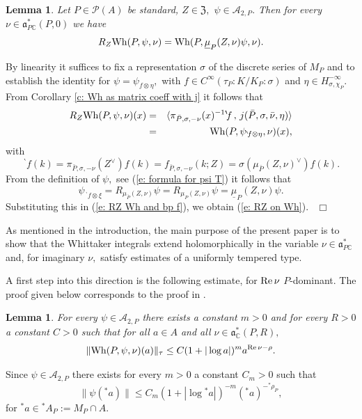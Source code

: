 \documentclass[12pt,a4paper]{article}
\newtheorem{Lemma}[Thm]{Lemma}
\newenvironment{lemma}[0]{\begin{Lemma}\noindent}%
{\end{Lemma}}
\def\proof{\par\noindent{\it Proof.}{\ }{\ }}
\def\qed{~\hfill\hbox{$\Box$}\medbreak}
\def\msy#1{{\mathbb #1}}
\def\C{{\msy C}}
\def\gs{\sigma}
\def\got#1{\mathfrak #1}
\def\fa{{\got a}}
\def\Re{{\rm Re}\,}
\def\inp#1#2{\langle#1\,,\,#2\rangle}
\def\iC{{\scriptscriptstyle \C}}
\def\cA{{\mathcal A}}
\def\cP{{\mathcal P}}
\numberwithin{Thm}{section}
\numberwithin{equation}{section}
\def\fZ{{\mathfrak Z}}
\def\Wh{{\rm Wh}}
\def\fadc{\fa_\C^*}
\def\faPdc{{\fa_{P\iC}^*}}
\numberwithin{equation}{section}
\def\fZ{{\mathfrak Z}}
\def\bp{\!{\,}^\backprime}
\def\faPdc{\fa_{P\iC}^*}
\def\cAtwoP{\cA_{2,P}}
\def\umu{\underline{\mu}}
\def\veec{\vee}%
\begin{document}
\begin{lemma}
Let $P \in \cP(A)$ be standard, $Z \in \fZ,$ $\psi \in \cAtwoP.$ Then for every $\nu \in \faPdc(P,0)$ we have 
\begin{equation}
\label{e: RZ on Wh}
R_Z \Wh(P,\psi ,\nu) = \Wh(P, \umu_P(Z,\nu)\psi, \nu).
\end{equation}
\end{lemma}

\proof
By linearity it suffices to fix a representation $\gs$ of the discrete series of $M_P$  
and to establish the identity for $\psi = \psi_{f \otimes \eta},$ with $f \in C^\infty(\tau_P:K/K_P:\gs)$ and $\eta \in H_{\gs,\chi_P}^{-\infty}.$ 
From Corollary \ref{c: Wh as matrix coeff with j} it follows that
\begin{eqnarray}\nonumber
R_Z \Wh(P, \psi, \nu)(x) &=& 
 \inp{\pi_{\bar P, \gs, -\nu}(x)^{-1} \bp\! f}{j(\bar P, \gs, \bar\nu, \eta)}\\
 &=& \Wh(P, \psi_{\bp\! f \otimes \eta}, \nu)(x), 
\label{e: RZ Wh and bp f}
\end{eqnarray}
with 
$$ 
\bp\! f (k) = \pi_{\bar P, \gs, -\nu}(Z^\veec) f (k) =  f_{\bar P, \gs, -\nu}(k; Z) =
\gs(\mu_{\bar P}(Z, \nu)^\veec) f(k) .
$$ 
From the definition of $\psi,$ see (\ref{e: formula for psi T}) it follows that
$$ 
\psi_{\bp\! f \otimes \xi} = R_{\mu_{\bar P}(Z, \nu)} \psi
= R_{\mu_P(Z, \nu)} \psi = \umu_P(Z, \nu) \psi.
$$ 
Substituting this in (\ref{e: RZ Wh and bp f}), we obtain (\ref{e: RZ on Wh}).
\qed

As mentioned in the introduction, the main purpose of the present paper is to show that the Whittaker integrals
extend holomorphically in the variable $\nu \in \faPdc$ and, for imaginary $\nu,$ satisfy estimates of a uniformly 
tempered type.

A first step into this direction is the following estimate, for $\Re \nu$ $P$-dominant.
The proof given below corresponds to the proof in \cite[Lemma 9.22.1]{HCwhit}.

\begin{lemma}
\label{l: first estimate Wh integral}
For every $\psi \in \cAtwoP$ there exists a constant $m > 0$ and for every $R > 0$ a constant
$C>0$ such that for all $a \in A$ 
and all $\nu \in \fadc(P,R),$ 
$$
\|\Wh(P, \psi, \nu)(a)\|_\tau \leq  C(1 + |\log a|)^m a^{\Re \nu -\rho}.
$$
\end{lemma}

\proof
Since $\psi \in \cAtwoP$ there exists for every $m >0$ a constant $C_m> 0$ such that
\begin{equation}
\label{e: estimate for psi}
\|\psi ({}^*\! a)\| \leq C_m (1 + |\log {}^*\! a|)^{-m} ({}^*\! a)^{-{}^*\!\rho_P},
\end{equation}
for ${}^*\!a \in {}^*A_P:= M_P\cap A.$ 
\end{document}
